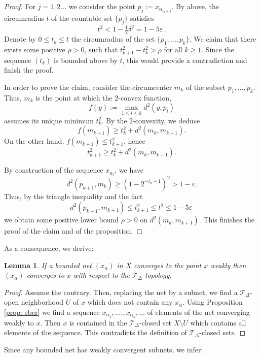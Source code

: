 \documentclass[12pt,leqno]{amsart}
\numberwithin{equation}{section}
\newtheorem{lem}[thm]{Lemma}
\theoremstyle{remark}
\begin{document}
\begin{proof}
For $j=1,2...$ we consider the point $p_j\mathrel{:=} x_{\alpha _{i_0+ j}}$. By above, the circumradius $t$
of the countable set $\{p_j\}$ satisfies 
$$t^2 < 1 -\tfrac 1 2 \delta ^2 = 1-5\varepsilon \,.$$ 
Denote by $0\leq t_k \leq t$ the circumradius of the set $\{p_1,...,p_k\}$.
We claim that there exists some positive $\rho >0$, such that $t^2_{k+1}-t^2_k >\rho$ for all $k\geq 1$. Since the sequence $(t_k)$ is bounded above by $t$, this would provide a contradiction and finish the proof.

In order to prove the claim, consider the circumcenter $m_k$ of the subset $p_1,...,p_k$.
Thus, $m_k$ is the point at which the $2$-convex function, 
$$f(y)\mathrel{:=} \max_{1\leq i \leq k} d^2 (y,p_i)$$ 
assumes its unique minimum $t_k ^2$. By the $2$-convexity, we deduce
$$f(m_{k+1}) \geq t_k ^2 + d^2 (m_k,m_{k+1}).$$
On the other hand, $f(m_{k+1}) \leq t^2_{k+1}$, hence 
$$t_{k+1} ^2 \geq t_k ^2 + d^2 (m_k,m_{k+1}).$$ 

By construction of the sequence $x_{\alpha_i}$, we have 
$$d^2(p_{k+1}, m_k) \geq (1- 2^{-i_0-1})^2 > 1 -\varepsilon .$$
Thus, by the triangle inequality and the fact 
$$d^2 (p_{k+1} , m_{k+1}) \leq t_{k+1} ^2 \leq t^2 \leq 1-5\varepsilon \,$$
we obtain some positive lower bound $\rho>0$ on $d^2(m_k,m_{k+1})$. 
This finishes the proof of the claim and of the proposition. 
\end{proof}

As a consequence, we derive: 

\begin{lem} \label{lem: h}
If a bounded net $(x_{\alpha})$ in $X$ converges to the point $x$ weakly then $(x_{\alpha})$ converges to $x$ with respect to the $\mathcal T_{\Delta}$-topology.
\end{lem} 

\begin{proof}
Assume the contrary.
Then, replacing the net by a subnet, we find a $\mathcal T_{\Delta}$-open neighborhood $U$ of $x$ which does not contain any $x_{\alpha}$. Using 
Proposition \ref{prop: eber} we find a sequence $x_{\alpha_1},....,x_{\alpha _k},...$ of elements of the net converging weakly to $x$. Then $x$ is contained in the $\mathcal T_{\Delta}$-closed set $X\setminus U$ which contains all elements of the sequence. This contradicts the definition of $\mathcal T_{\Delta}$-closed sets. 	
\end{proof}

Since any bounded net has weakly convergent subnets, we infer:
\end{document}
